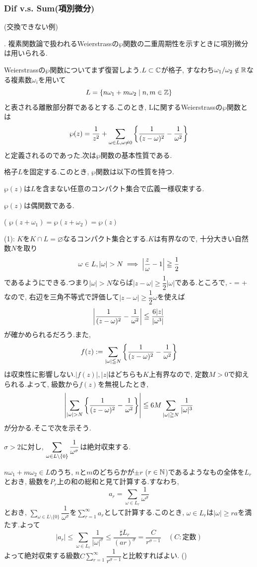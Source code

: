 \subsubsection{Dif v.s. Sum(項別微分)}
\begin{eg}(交換できない例)

\end{eg}
.
複素関数論で扱われるWeierstrassの$\wp$関数の二重周期性を示すときに項別微分は用いられる.\par
Weierstrassの$\wp$関数についてまず復習しよう.$L\subset \mathbb{C}$が格子, すなわち$\omega_1/\omega_2 \notin \mathbb{R}$なる複素数$\omega_i$を用いて
\[ L = \{ n\omega_1 + m\omega_2 \mid n,m\in \mathbb{Z} \}\]
と表される離散部分群であるとする.このとき, Lに関するWeierstrassの$\wp$関数とは
\[\wp(z) = \dfrac{1}{z^2} + \sum_{\omega\in L, \omega\neq 0} \left\{ \dfrac{1}{(z-\omega)^2}  -  \dfrac{1}{\omega^2} \right\}\]
と定義されるのであった.次は$\wp$関数の基本性質である.
\begin{prop}
格子$L$を固定する.このとき, $\wp$関数は以下の性質を持つ.
\ben
\item $\wp(z)$は$L$を含まない任意のコンパクト集合で広義一様収束する.
\item $\wp(z)$は偶関数である.
\item ( $\wp(z+\omega_1) = \wp(z+\omega_2) = \wp(z)$
\een
\end{prop}
\prf (1): $K$を$K\cap L = \varnothing$なるコンパクト集合とする.$K$は有界なので, 十分大きい自然数$N$を取り
\[\omega\in L , |\omega| > N \implies \left| \dfrac{z}{\omega} - 1 \right| \geqq \dfrac{1}{2}\]
であるようにできる.つまり$|\omega|>N$ならば$|z-\omega| \geq \dfrac{1}{2}|\omega|$である.ところで,
\beqn
{} -  =  + 
\eeqn
なので, 右辺を三角不等式で評価して$|z-\omega|\geq \dfrac{1}{2}\omega$を使えば
\[\left| \dfrac{1}{(z-\omega)^2} - \dfrac{1}{\omega^2} \right| \leqq \dfrac{6|z|}{|\omega^3|}\]
が確かめられるだろう.また,
\[f(z):= \sum_{|\omega|\leqq N} \left\{ \dfrac{1}{(z-\omega)^2} - \dfrac{1}{\omega^2} \right\}\]
は収束性に影響しない.$|f(z)|, |z|$はどちらも$K$上有界なので, 定数$M>0$で抑えられる.よって, 級数から$f(z)$を無視したとき,
\[\left| \sum_{|\omega| > N} \left\{ \dfrac{1}{(z-\omega)^2} - \dfrac{1}{\omega^2} \right\} \right| \leqq 6M \sum_{|\omega|\geqq N} \dfrac{1}{|\omega|^3}\]
が分かる.そこで次を示そう.
\begin{claim}
$\sigma > 2$に対し, $\displaystyle\sum_{\omega \in L \setminus{\{ 0 \}}} \dfrac{1}{\omega^{\sigma}}$は絶対収束する.
\end{claim}
\prf
$n\omega_1 + m\omega_2\in L$のうち, $n$と$m$のどちらかが$\pm r$ ($r\in \mathbb{N}$)であるようなもの全体を$L_r$とおき, 級数を$P_r$上の和の総和と見て計算する.すなわち,
\[a_r = \sum_{\omega\in L_r} \dfrac{1}{\omega^{\sigma}} \]
とおき, $\sum_{\omega\in L\setminus{\{ 0 \}}} \dfrac{1}{\omega^{\sigma}}$を$\sum_{r=1}^{\infty} a_r$として計算する.このとき, $\omega\in L_r$は$|\omega| \geq ra$を満たす.よって
\[|a_r| \leq \sum_{\omega\in L_r} \dfrac{1}{|\omega|^{\sigma}} \leq \dfrac{\sharp L_r}{(ar)^{\sigma}} = \dfrac{C}{r^{\sigma - 1}} \quad (C:\text{定数})\]
よって絶対収束する級数$C\sum_{r=1}^{\infty} \dfrac{1}{r^{\sigma - 1}}$と比較すればよい.
()

